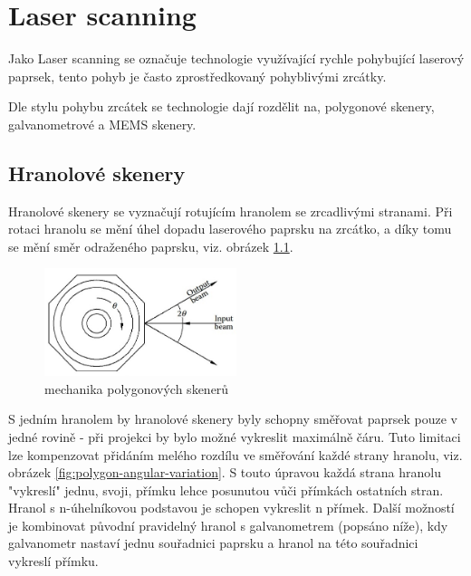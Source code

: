 \chapter{Laser scanning~\cite{scanning-handbook}}

Jako Laser scanning se označuje technologie využívající rychle pohybující laserový paprsek, tento pohyb je často zprostředkovaný pohyblivými zrcátky.

Dle stylu pohybu zrcátek se technologie dají rozdělit na, polygonové skenery, galvanometrové a MEMS skenery.

\section{Hranolové skenery}
Hranolové skenery se vyznačují rotujícím hranolem se zrcadlivými stranami. Při rotaci hranolu se mění úhel dopadu laserového paprsku na zrcátko, a díky tomu se mění směr odraženého paprsku, viz. obrázek \ref{fig:polygon-scanner}. 

\begin{figure}[H]
  \centering
  \includegraphics[width=0.5\textwidth]{img/polygon-scanner.jpg}
  \caption{\label{fig:polygon-scanner} mechanika polygonových skenerů}
\end{figure}


%

S jedním hranolem by hranolové skenery byly schopny směřovat paprsek pouze v jedné rovině - při projekci by bylo možné vykreslit maximálně čáru. Tuto limitaci lze kompenzovat přidáním melého rozdílu ve směřování každé strany hranolu, viz. obrázek \ref{fig:polygon-angular-variation}. S touto úpravou každá strana hranolu "vykreslí" jednu, svoji, přímku lehce posunutou vůči přímkách ostatních stran. Hranol s n-úhelníkovou podstavou je schopen vykreslit n přímek.
Další možností je kombinovat původní pravidelný hranol s galvanometrem (popsáno níže), kdy galvanometr nastaví jednu souřadnici paprsku a hranol na této souřadnici vykreslí přímku.

